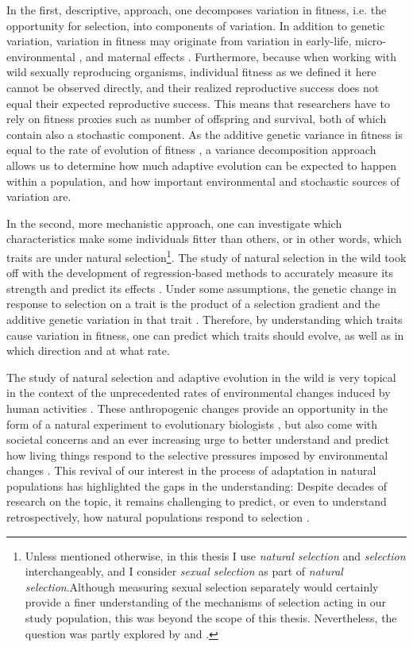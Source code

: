 In the first, descriptive, approach, one decomposes variation in fitness, i.e. the opportunity for selection, into components of variation. In addition to genetic variation, variation in fitness may originate from variation in early-life, micro-environmental \parencite{Turner2009}, and maternal effects \parencite{Wolf2009}. Furthermore, because when working with wild sexually reproducing organisms, individual fitness as we defined it here cannot be observed directly, and their realized reproductive success does not equal their expected reproductive success. This means that researchers have to rely on fitness proxies such as number of offspring and survival, both of which contain also a stochastic component. As the additive genetic variance in fitness is equal to the rate of evolution of fitness \parencite{Fisher1930}, a variance decomposition approach allows us to determine how much adaptive evolution can be expected to happen within a population, and how important environmental and stochastic sources of variation are.

In the second, more mechanistic approach, one can investigate which characteristics make some individuals fitter than others, or in other words, which traits are under natural selection\footnote{Unless mentioned otherwise, in this thesis I use \emph{natural selection} and \emph{selection} interchangeably, and I consider \emph{sexual selection} as part of \emph{natural selection}.Although measuring sexual selection separately would certainly provide a finer understanding of the mechanisms of selection acting in our study population, this was beyond the scope of this thesis. Nevertheless, the question was partly explored by \cite{Garcia-Navas2016} and \cite{Garcia-Navas2015a}.}. The study of natural selection in the wild took off with the development of regression-based methods to accurately measure its strength and predict its effects \parencite{Lande1979, Lande1983}. Under some assumptions, the genetic change in response to selection on a trait is the product of a selection gradient and the additive genetic variation in that trait \parencite{Lush1937}. Therefore, by understanding which traits cause variation in fitness, one can predict which traits should evolve, as well as in which direction and at what rate. 

The study of natural selection and adaptive evolution in the wild is very topical in the context of the unprecedented rates of environmental changes induced by human activities \parencite{parmesan2006}. These anthropogenic changes provide an opportunity in the form of a natural experiment to evolutionary biologists \parencite{Altermatt2016, Brookfield2016}, but also come with societal concerns and an ever increasing urge to better understand and predict how living things respond to the selective pressures imposed by environmental changes \parencite{McCarty2001, Shaw2013}. This revival of our interest in the process of adaptation in natural populations has highlighted the gaps in the understanding: Despite decades of research on the topic, it remains challenging to predict, or even to understand retrospectively, how natural populations respond to selection \parencite{Merila2001, Tafani2013, Shaw2013, Brookfield2016}.

